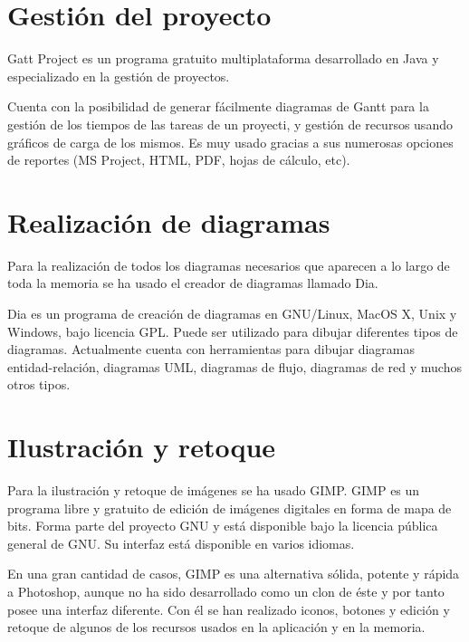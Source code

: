 \section{Gestión del proyecto}

Gatt Project es un programa gratuito multiplataforma desarrollado en Java y especializado en la gestión de proyectos.


Cuenta con la posibilidad de generar fácilmente diagramas de Gantt para la gestión de los tiempos de las tareas de un proyecti, y gestión de recursos usando gráficos de carga de los mismos. Es muy usado gracias a sus numerosas opciones de reportes (MS Project, HTML, PDF, hojas de cálculo, etc).

\section{Realización de diagramas}

Para la realización de todos los diagramas necesarios que aparecen a lo largo de toda la memoria se ha usado el creador de diagramas llamado Dia.\\


Dia es un programa de creación de diagramas en GNU/Linux, MacOS X, Unix y Windows, bajo licencia GPL. Puede ser utilizado para dibujar diferentes tipos de diagramas. Actualmente cuenta con herramientas para dibujar diagramas entidad-relación, diagramas UML, diagramas de flujo, diagramas de red y muchos otros tipos.

\section{Ilustración y retoque}

Para la ilustración y retoque de imágenes se ha usado GIMP. GIMP es un programa libre y gratuito de edición de imágenes digitales en forma de mapa de bits. Forma parte del proyecto GNU y está disponible bajo la licencia pública general de GNU. Su interfaz está disponible en varios idiomas.


En una gran cantidad de casos, GIMP es una alternativa sólida, potente y rápida a Photoshop, aunque no ha sido desarrollado como un clon de éste y por tanto posee una interfaz diferente. Con él se han realizado iconos, botones y edición y retoque de algunos de los recursos usados en la aplicación y en la memoria.
